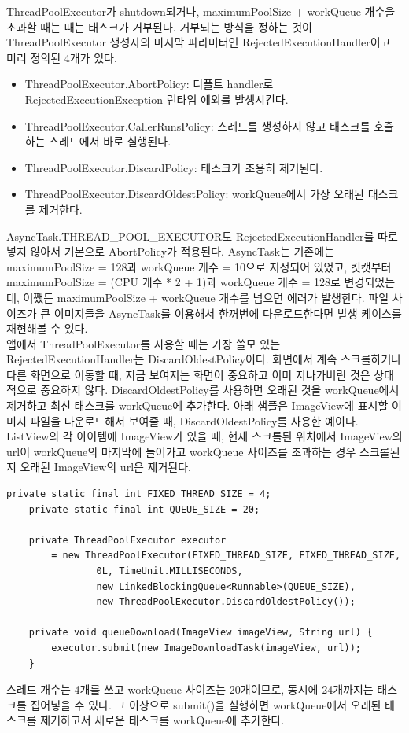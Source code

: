 ThreadPoolExecutor가 shutdown되거나, maximumPoolSize + workQueue 개수을 초과할 때는 때는 태스크가 거부된다. 거부되는 방식을 정하는 것이 ThreadPoolExecutor 생성자의 마지막 파라미터인 RejectedExecutionHandler이고 미리 정의된 4개가 있다.
\begin{itemize}
\item ThreadPoolExecutor.AbortPolicy: 디폴트 handler로 RejectedExecutionException 런타임 예외를 발생시킨다.
\item ThreadPoolExecutor.CallerRunsPolicy: 스레드를 생성하지 않고 태스크를 호출하는 스레드에서 바로 실행된다. 
\item ThreadPoolExecutor.DiscardPolicy: 태스크가 조용히 제거된다.
\item ThreadPoolExecutor.DiscardOldestPolicy: workQueue에서 가장 오래된 태스크를 제거한다.
\end{itemize}

AsyncTask.THREAD\_POOL\_EXECUTOR도 RejectedExecutionHandler를 따로 넣지 않아서 기본으로 AbortPolicy가 적용된다. AsyncTask는 기존에는 maximumPoolSize = 128과 workQueue 개수 = 10으로 지정되어 있었고, 킷캣부터 maximumPoolSize = (CPU 개수 * 2 + 1)과 workQueue 개수 = 128로 변경되었는데, 어쨌든 maximumPoolSize + workQueue 개수를 넘으면 에러가 발생한다. 파일 사이즈가 큰 이미지들을 AsyncTask를 이용해서 한꺼번에 다운로드한다면 발생 케이스를 재현해볼 수 있다.\\

앱에서 ThreadPoolExecutor를 사용할 때는 가장 쓸모 있는 RejectedExecutionHandler는 DiscardOldestPolicy이다. 
화면에서 계속 스크롤하거나 다른 화면으로 이동할 때, 지금 보여지는 화면이 중요하고 이미 지나가버린 것은 상대적으로 중요하지 않다. 
DiscardOldestPolicy를 사용하면 오래된 것을 workQueue에서 제거하고 최신 태스크를 workQueue에 추가한다. 
아래 샘플은 ImageView에 표시할 이미지 파일을 다운로드해서 보여줄 때, DiscardOldestPolicy를 사용한 예이다.
ListView의 각 아이템에 ImageView가 있을 때, 현재 스크롤된 위치에서 ImageView의 url이 workQueue의 마지막에 들어가고 workQueue 사이즈를 초과하는 경우 스크롤된 지 오래된 ImageView의 url은 제거된다.
\begin{lstlisting}[frame=single] 
	private static final int FIXED_THREAD_SIZE = 4;
	private static final int QUEUE_SIZE = 20;
	
	private ThreadPoolExecutor executor
		= new ThreadPoolExecutor(FIXED_THREAD_SIZE, FIXED_THREAD_SIZE, 
				0L, TimeUnit.MILLISECONDS, 
				new LinkedBlockingQueue<Runnable>(QUEUE_SIZE), 
				new ThreadPoolExecutor.DiscardOldestPolicy());
	
	private void queueDownload(ImageView imageView, String url) {
		executor.submit(new ImageDownloadTask(imageView, url));
	}
\end{lstlisting}
스레드 개수는 4개를 쓰고 workQueue 사이즈는 20개이므로, 동시에 24개까지는 태스크를 집어넣을 수 있다. 그 이상으로 submit()을 실행하면 workQueue에서 오래된 태스크를 제거하고서 새로운 태스크를 workQueue에 추가한다.\\
	
